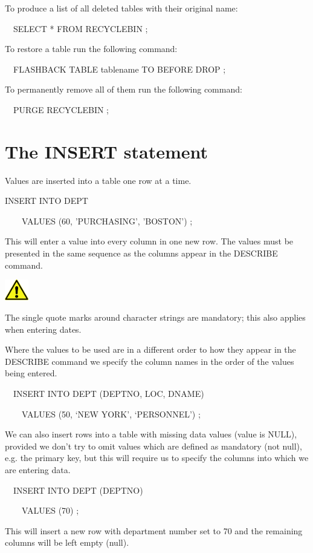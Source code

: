 To produce a list of all deleted tables with their original name:

\ \ SELECT * FROM RECYCLEBIN ;

To restore a table run the following command: 

\ \ FLASHBACK TABLE tablename TO BEFORE DROP ;

To permanently remove all of them run the following command: 

\ \ PURGE RECYCLEBIN ;

\clearpage
\section{The INSERT statement}
Values are inserted into a table one row at a time.

INSERT INTO DEPT

\ \ \ \ VALUES (60, 'PURCHASING', 'BOSTON') ;

This will enter a value into every column in one new row.  The values must be presented in the same sequence as the columns appear in the DESCRIBE command.



\begin{center}
  
\includegraphics[width=1.05cm,height=0.903cm]{images/img (2).png}

\end{center}
The single quote marks around character strings are mandatory; this also applies when entering dates.

Where the values to be used are in a different order to how they appear in the DESCRIBE command we specify the column names in the order of the values being entered.

\ \ INSERT INTO DEPT (DEPTNO, LOC, DNAME)

\ \ \ \ VALUES (50, `NEW YORK', `PERSONNEL') ;

We can also insert rows into a table with missing data values (value is NULL), provided we don't try to omit values which are defined as mandatory (not null), e.g. the primary key, but this will require us to specify the columns into which we are entering data.

\ \ INSERT INTO DEPT (DEPTNO)

\ \ \ \ VALUES (70) ;

This will insert a new row with department number set to 70 and the remaining columns will be left empty (null).

